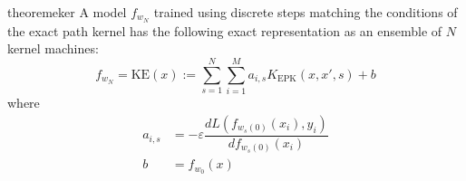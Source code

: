 


\begin{restatable}{theorem}{eker}
\label{thm:eker}
A model $f_{w_N}$ trained using discrete steps matching the conditions of the exact path kernel has the following exact representation as an ensemble of $N$ kernel machines:
\begin{equation}
f_{w_N} = \text{KE}(x) :=  \sum_{s = 1}^N \sum_{i = 1}^{M} a_{i,s} K_{\text{EPK}}(x, x', s) + b
\label{ensemble}
\end{equation}
where
\begin{align}
a_{i, s} &= -\varepsilon  \dfrac{d L(f_{w_s(0)}(x_i),  y_i)}{d f_{w_s(0)}(x_i)} \\
b &= f_{w_0}(x)
\end{align}
\end{restatable}

